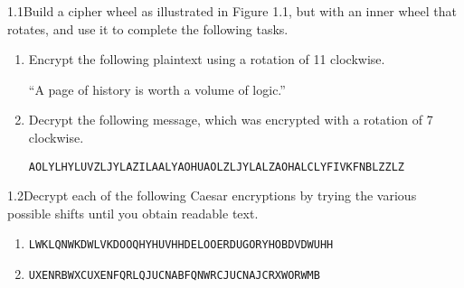 \begin{exercise}
    {1.1}Build a cipher wheel as illustrated in Figure 1.1, but with an inner wheel that rotates, and use it to complete the following tasks. 
    \begin{enumerate}
        \item Encrypt the following plaintext using a rotation of 11 clockwise.
        \begin{center}
            ``A page of history is worth a volume of logic.''
        \end{center}
        \item Decrypt the following message, which was encrypted with a rotation of 7 clockwise.
        \begin{center}
            \texttt{AOLYLHYLUVZLJYLAZILAALYAOHUAOLZLJYLALZAOHALCLYFIVKFNBLZZLZ}
        \end{center}
    \end{enumerate}
\end{exercise}


\begin{exercise}
    {1.2}Decrypt each of the following Caesar encryptions by trying the various possible
shifts until you obtain readable text.
    \begin{enumerate}
        \item \texttt{LWKLQNWKDWLVKDOOQHYHUVHHDELOOERDUGORYHOBDVDWUHH}
        \item \texttt{UXENRBWXCUXENFQRLQJUCNABFQNWRCJUCNAJCRXWORWMB}
    \end{enumerate}
\end{exercise}



